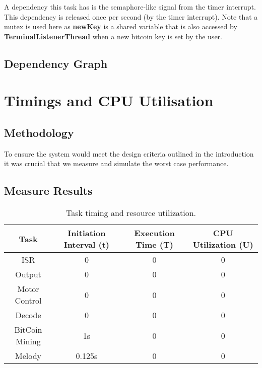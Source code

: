 \documentclass{article}
\begin{document}
\bigskip



\bigskip

A dependency this task has is the semaphore-like signal from the timer interrupt. This dependency is released once per second (by the timer interrupt). Note that a mutex is used here as \textbf{newKey} is a shared variable that is also accessed by \textbf{TerminalListenerThread} when a new bitcoin key is set by the user. 


\subsection{Dependency Graph}



\section{Timings and CPU Utilisation}
\subsection{Methodology}
To ensure the system would meet the design criteria outlined in the introduction it was crucial that we measure and simulate the worst case performance. 

\subsection{Measure Results}
\begin{table}[ht]
\centering                      %
\begin{tabular}{c c c c}        %
Task & Initiation Interval (t) & Execution Time (T) & CPU Utilization (U) \\ [0.5ex]   %
\hline                          %
ISR & 0 & 0 & 0 \\           %
Output & 0 & 0 & 0 \\                         
Motor Control & 0 & 0  & 0 \\
Decode & 0 & 0 & 0 \\
BitCoin Mining & 1s & 0 & 0 \\
Melody & 0.125s & 0 & 0\\[1ex]     %
\end{tabular}
\caption{Task timing and resource utilization.} 
\label{table:nonlin}            %
\end{table}
\end{document}
